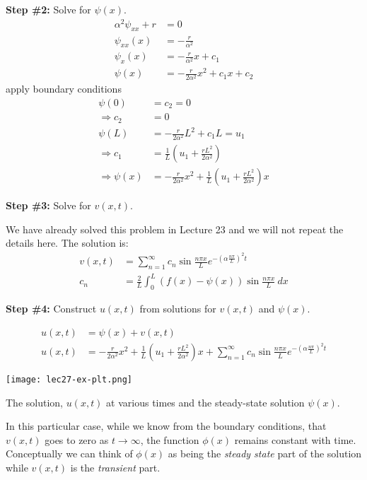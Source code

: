 \vspace{0.25cm}

\noindent\textbf{Step \#2:}  Solve for $\psi(x)$.
\begin{align*}
\alpha^2\psi_{xx}+r &= 0 \\
\psi_{xx}(x) &= -\frac{r}{\alpha^2} \\
\psi_{x}(x) &= -\frac{r}{\alpha^2}x + c_1 \\
\psi(x) &= -\frac{r}{2\alpha^2}x^2+c_1x + c_2
\end{align*}
apply boundary conditions
\begin{align*}
\psi(0) &= c_2 = 0 \\
\Rightarrow c_2 &= 0 \\
\psi(L) &= -\frac{r}{2\alpha^2}L^2 + c_1 L = u_1 \\
\Rightarrow c_1 &= \frac{1}{L}\left(u_1+\frac{rL^2}{2 \alpha^2}\right) \\
\Rightarrow \psi(x) &= -\frac{r}{2\alpha^2}x^2 + \frac{1}{L}\left(u_1+\frac{rL^2}{2 \alpha^2}\right)x
\end{align*}

\vspace{0.25cm}

\noindent\textbf{Step \#3:} Solve for $v(x,t)$.

\vspace{0.25cm}

\noindent We have already solved this problem in Lecture 23 and we will not repeat the details here.  The solution is:
\begin{align*}
v(x,t) &= \sum\limits_{n=1}^{\infty} c_n \sin{\frac{n \pi x}{L}}e^{-\left(\alpha \frac{n \pi}{L}\right)^2 t} \\
c_n &= \frac{2}{L} \int_0^L \left(f(x)-\psi(x)\right)\sin{\frac{n \pi x}{L}} \ dx
\end{align*}

\vspace{0.25cm}

\noindent\textbf{Step \#4:} Construct $u(x,t)$ from solutions for $v(x,t)$ and $\psi(x)$.

\begin{align*}
u(x,t) &= \psi(x) + v(x,t) \\
u(x,t) &= -\frac{r}{2\alpha^2}x^2 + \frac{1}{L}\left(u_1+\frac{rL^2}{2 \alpha^2}\right)x + \sum\limits_{n=1}^{\infty} c_n \sin{\frac{n \pi x}{L}}e^{-\left(\alpha \frac{n \pi}{L}\right)^2 t}
\end{align*}
\begin{marginfigure}
\texttt{[image: lec27-ex-plt.png]}
\caption{The solution, $u(x,t)$ at various times and the steady-state solution $\psi(x)$.}
\label{fig:lec27-ex-plt}
\end{marginfigure}
In this particular case, while we know from the boundary conditions, that $v(x,t)$ goes to zero as $t \rightarrow \infty$, the function $\phi(x)$ remains constant with time.  Conceptually we can think of $\phi(x)$ as being the \emph{steady state} part of the solution while $v(x,t)$ is the \emph{transient} part.

